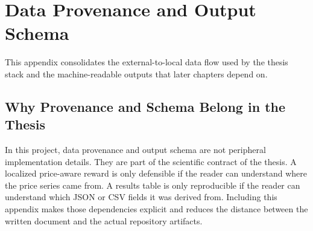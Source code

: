 \chapter{Data Provenance and Output Schema}

This appendix consolidates the external-to-local data flow used by the thesis stack and the machine-readable outputs that later chapters depend on.





\section{Why Provenance and Schema Belong in the Thesis}

In this project, data provenance and output schema are not peripheral implementation details. They are part of the scientific contract of the thesis. A localized price-aware reward is only defensible if the reader can understand where the price series came from. A results table is only reproducible if the reader can understand which JSON or CSV fields it was derived from. Including this appendix makes those dependencies explicit and reduces the distance between the written document and the actual repository artifacts.
